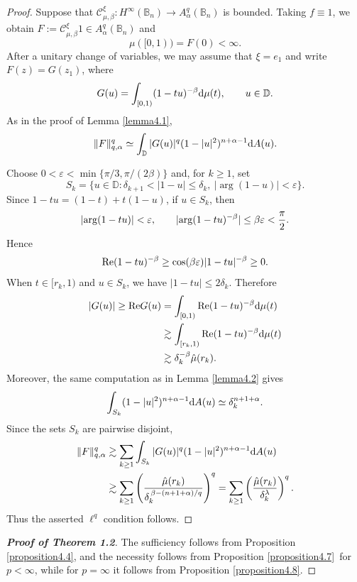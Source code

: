 \documentclass[preprint,12pt,times]{elsarticle}
\theoremstyle{definition}
\theoremstyle{remark}
\numberwithin{equation}{section}
\begin{document}
\begin{proof}
Suppose that $\mathcal{C}_{\mu,\beta}^{\xi}:H^{\infty}(\mathbb{B}_n)\to A_{\alpha}^q(\mathbb{B}_n)$ is bounded. Taking $f\equiv1$, we obtain
$F:=\mathcal{C}_{\mu,\beta}^{\xi}1\in A_{\alpha}^q(\mathbb{B}_n)$ and
\[
    \mu([0,1))=F(0)<\infty.
\]
After a unitary change of variables, we may assume that $\xi=e_1$ and write $F(z)=G(z_1)$, where
\[
    G(u)=\int_{[0,1)}(1-tu)^{-\beta}{\rm d}\mu(t),
    \qquad u\in\mathbb{D}.
\]
As in the proof of Lemma \ref{lemma4.1},
\[
    \|F\|_{q,\alpha}^{q}\simeq
    \int_{\mathbb{D}}|G(u)|^q
    (1-|u|^2)^{n+\alpha-1}{\rm d}A(u).
\]

Choose $0<\varepsilon<\min\{\pi/3,\pi/(2\beta)\}$ and, for $k\geq1$, set
\[
    S_k=\big\{u\in\mathbb{D}:\delta_{k+1}<|1-u|\leq\delta_k,
    \ |\arg(1-u)|<\varepsilon\big\}.
\]
Since $1-tu=(1-t)+t(1-u)$, if $u\in S_k$, then
\[
    |{\rm arg}(1-tu)|<\varepsilon,
    \qquad
    |{\rm arg}(1-tu)^{-\beta}|\leq\beta\varepsilon<\frac{\pi}{2}.
\]
Hence
\[
    {\rm Re}(1-tu)^{-\beta}
    \geq \cos(\beta\varepsilon)|1-tu|^{-\beta}\geq0.
\]
When $t\in[r_k,1)$ and $u\in S_k$, we have $|1-tu|\leq2\delta_k$. Therefore
\begin{align*}
|G(u)|\geq{\rm Re}G(u)
&=\int_{[0,1)}{\rm Re}(1-tu)^{-\beta}{\rm d}\mu(t)\\
&\gtrsim\int_{[r_k,1)}{\rm Re}(1-tu)^{-\beta}{\rm d}\mu(t)\\
&\gtrsim\delta_k^{-\beta}\hat{\mu}(r_k).
\end{align*}
Moreover, the same computation as in Lemma \ref{lemma4.2} gives
\[
    \int_{S_k}(1-|u|^2)^{n+\alpha-1}{\rm d}A(u)
    \simeq\delta_k^{n+1+\alpha}.
\]
Since the sets $S_k$ are pairwise disjoint,
\begin{align*}
\|F\|_{q,\alpha}^{q}
&\gtrsim\sum_{k\geq1}\int_{S_k}|G(u)|^q
(1-|u|^2)^{n+\alpha-1}{\rm d}A(u)\\
&\gtrsim\sum_{k\geq1}
\left(
\frac{\hat{\mu}(r_k)}
{\delta_k^{\,\beta-(n+1+\alpha)/q}}
\right)^q
=
\sum_{k\geq1}
\left(\frac{\hat{\mu}(r_k)}{\delta_k^{\lambda}}\right)^q.
\end{align*}
Thus the asserted $\ell^q$ condition follows.
\end{proof}

\begin{proof}[{\bf Proof of Theorem 1.2}]
The sufficiency follows from Proposition \ref{proposition4.4}, and the necessity follows from Proposition \ref{proposition4.7}\ {for $p<\infty$, while for $p=\infty$ it follows from Proposition \ref{proposition4.8}}.
\end{proof}
\end{document}
